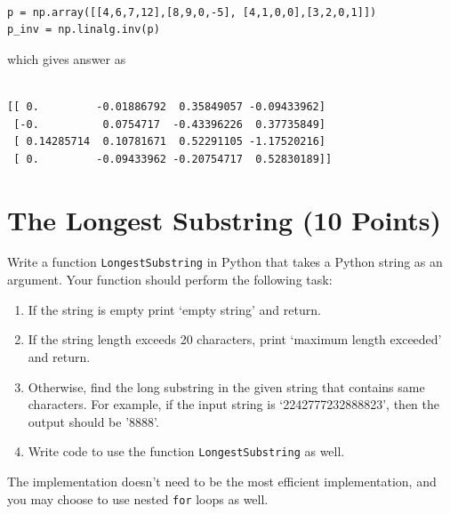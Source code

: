 \documentclass[12pt, xcolor=dvipsnames,svgnames,x11names]{article}
\begin{document}
\begin{answerbox}


\begin{verbatim}
      
p = np.array([[4,6,7,12],[8,9,0,-5], [4,1,0,0],[3,2,0,1]])
p_inv = np.linalg.inv(p)

\end{verbatim}

which gives answer as

\begin{verbatim}
      
[[ 0.         -0.01886792  0.35849057 -0.09433962]
 [-0.          0.0754717  -0.43396226  0.37735849]
 [ 0.14285714  0.10781671  0.52291105 -1.17520216]
 [ 0.         -0.09433962 -0.20754717  0.52830189]]

\end{verbatim}

\end{answerbox}


\section{The Longest Substring (10 Points)}
Write a function \texttt{LongestSubstring} in Python that takes a Python string as an argument. Your function should perform the following task:

\begin{enumerate}
\item If the string is empty print `empty string' and return.
\item If the string length exceeds 20 characters, print `maximum length exceeded' and return.
\item Otherwise, find the long substring in the given string that contains same characters. For example, if the input string is `2242777232888823', then the output should be '8888'.
\item Write code to use the function \texttt{LongestSubstring} as well.
\end{enumerate}
The implementation doesn't need to be the most efficient implementation, and you may choose to use nested \texttt{for} loops as well.
\end{document}
